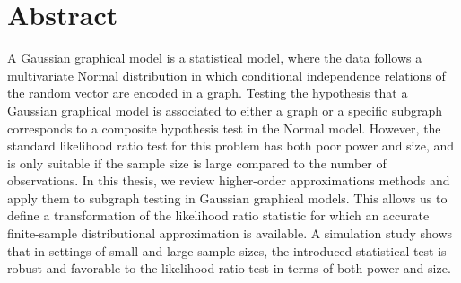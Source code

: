 \section*{Abstract}

A Gaussian graphical model is a statistical model, where the data follows a multivariate Normal distribution in which conditional independence relations of the random vector are encoded in a graph. Testing the hypothesis that a Gaussian graphical model is associated to either a graph or a specific subgraph corresponds to a composite hypothesis test in the Normal model. However, the standard likelihood ratio test for this problem has both poor power and size, and is only suitable if the sample size is large compared to the number of observations. In this thesis, we review higher-order approximations methods and apply them to subgraph testing in Gaussian graphical models. This allows us to define a transformation of the likelihood ratio statistic for which an accurate finite-sample distributional approximation is available. A simulation study shows that in settings of small and large sample sizes, the introduced statistical test is robust and favorable to the likelihood ratio test in terms of both power and size.